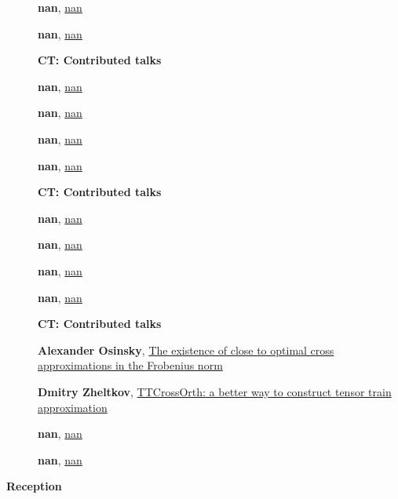 \documentclass[ILAS2025-program.tex]{subfiles}
\begin{document}
\begin{description}
\begin{description}
        \item[] \hypertarget{up0106}{}\textbf{nan}, \hyperlink{down0106}{nan}
        \item[] \hypertarget{up0107}{}\textbf{nan}, \hyperlink{down0107}{nan}
        \end{description}
    \begin{description}
    \item[] {\color{mstitle}\textbf{CT: Contributed talks}} 
    \item[] \hypertarget{up0108}{}\textbf{nan}, \hyperlink{down0108}{nan}
        \item[] \hypertarget{up0109}{}\textbf{nan}, \hyperlink{down0109}{nan}
        \item[] \hypertarget{up0110}{}\textbf{nan}, \hyperlink{down0110}{nan}
        \item[] \hypertarget{up0111}{}\textbf{nan}, \hyperlink{down0111}{nan}
        \end{description}
    \begin{description}
    \item[] {\color{mstitle}\textbf{CT: Contributed talks}} 
    \item[] \hypertarget{up0112}{}\textbf{nan}, \hyperlink{down0112}{nan}
        \item[] \hypertarget{up0113}{}\textbf{nan}, \hyperlink{down0113}{nan}
        \item[] \hypertarget{up0114}{}\textbf{nan}, \hyperlink{down0114}{nan}
        \item[] \hypertarget{up0115}{}\textbf{nan}, \hyperlink{down0115}{nan}
        \end{description}
    \begin{description}
    \item[] {\color{mstitle}\textbf{CT: Contributed talks}} 
    \item[] \hypertarget{up0116}{}\textbf{Alexander Osinsky}, \hyperlink{down0116}{The existence of close to optimal cross approximations in the Frobenius norm}
        \item[] \hypertarget{up0117}{}\textbf{Dmitry Zheltkov}, \hyperlink{down0117}{TTCrossOrth: a better way to construct tensor train approximation}
        \item[] \hypertarget{up0118}{}\textbf{nan}, \hyperlink{down0118}{nan}
        \item[] \hypertarget{up0119}{}\textbf{nan}, \hyperlink{down0119}{nan}
        \end{description}
    \item[\info{18:00\textrm{--}20:00}] \textbf{Reception} 
    \end{description}
    \newpage
\end{document}
